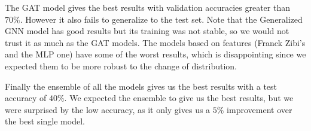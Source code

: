 \documentclass[switch, 11pt]{article}
\begin{document}
\begin{multicols}{2}
    The GAT model gives the best results with validation accuracies greater than $70\%$. However it also fails to generalize to the test set. Note that the Generalized GNN model has good results but its training was not stable, so we would not trust it as much as the GAT models. The models based on features (Franck Zibi's and the MLP one) have some of the worst results, which is disappointing since we expected them to be more robust to the change of distribution.

    Finally the ensemble of all the models gives us the best results with a test accuracy of $40\%$. We expected the ensemble to give us the best results, but we were surprised by the low accuracy, as it only gives us a $5\%$ improvement over the best single model.

    \begin{table}[H]
        \begin{center}
\end{center}
\end{table}
\end{multicols}
\end{document}

